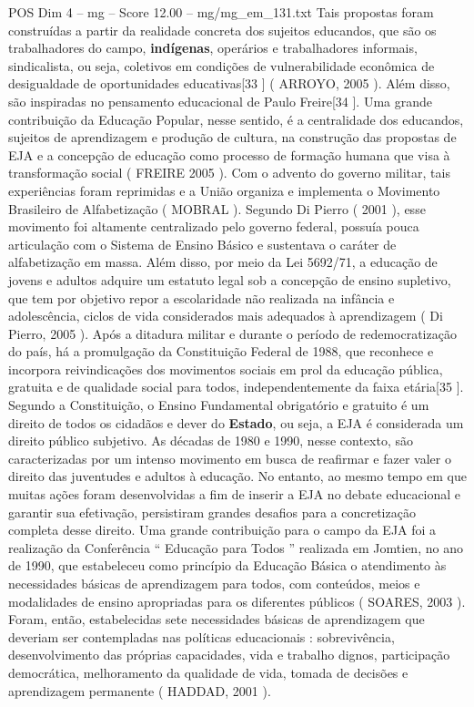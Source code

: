 \begin{textsample}{POS Dim 4 – mg – Score 12.00 – mg/mg\_em\_131.txt}
Tais propostas foram construídas a partir da realidade concreta dos sujeitos educandos, que são os trabalhadores do campo, \textbf{indígenas}, operários e trabalhadores informais, sindicalista, ou seja, coletivos em condições de vulnerabilidade econômica de desigualdade de oportunidades educativas[33 ] ( ARROYO, 2005 ).
Além disso, são inspiradas no pensamento educacional de Paulo Freire[34 ].
Uma grande contribuição da Educação Popular, nesse sentido, é a centralidade dos educandos, sujeitos de aprendizagem e produção de cultura, na construção das propostas de EJA e a concepção de educação como processo de formação humana que visa à transformação social ( FREIRE 2005 ).
Com o advento do governo militar, tais experiências foram reprimidas e a União organiza e implementa o Movimento Brasileiro de Alfabetização ( MOBRAL ).
Segundo Di Pierro ( 2001 ), esse movimento foi altamente centralizado pelo governo federal, possuía pouca articulação com o Sistema de Ensino Básico e sustentava o caráter de alfabetização em massa.
Além disso, por meio da Lei 5692/71, a educação de jovens e adultos adquire um estatuto legal sob a concepção de ensino supletivo, que tem por objetivo repor a escolaridade não realizada na infância e adolescência, ciclos de vida considerados mais adequados à aprendizagem ( Di Pierro, 2005 ).
Após a ditadura militar e durante o período de redemocratização do país, há a promulgação da Constituição Federal de 1988, que reconhece e incorpora reivindicações dos movimentos sociais em prol da educação pública, gratuita e de qualidade social para todos, independentemente da faixa etária[35 ].
Segundo a Constituição, o Ensino Fundamental obrigatório e gratuito é um direito de todos os cidadãos e dever do \textbf{Estado}, ou seja, a EJA é considerada um direito público subjetivo.
As décadas de 1980 e 1990, nesse contexto, são caracterizadas por um intenso movimento em busca de reafirmar e fazer valer o direito das juventudes e adultos à educação.
No entanto, ao mesmo tempo em que muitas ações foram desenvolvidas a fim de inserir a EJA no debate educacional e garantir sua efetivação, persistiram grandes desafios para a concretização completa desse direito.
Uma grande contribuição para o campo da EJA foi a realização da Conferência “ Educação para Todos ” realizada em Jomtien, no ano de 1990, que estabeleceu como princípio da Educação Básica o atendimento às necessidades básicas de aprendizagem para todos, com conteúdos, meios e modalidades de ensino apropriadas para os diferentes públicos ( SOARES, 2003 ).
Foram, então, estabelecidas sete necessidades básicas de aprendizagem que deveriam ser contempladas nas políticas educacionais : sobrevivência, desenvolvimento das próprias capacidades, vida e trabalho dignos, participação democrática, melhoramento da qualidade de vida, tomada de decisões e aprendizagem permanente ( HADDAD, 2001 ).

\end{textsample}
